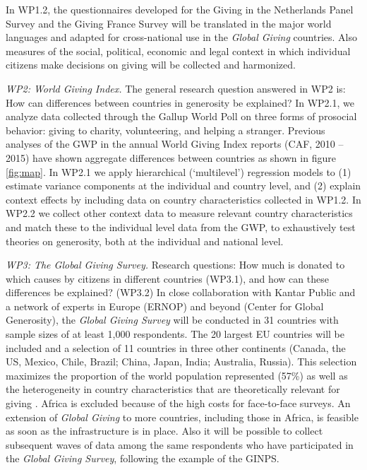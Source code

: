\documentclass[twocolumn, serif, rga, numeric]{jote-article}
\begin{document}
In WP1.2, the questionnaires developed for the Giving in the Netherlands Panel Survey and the Giving France Survey will be translated in the major world languages and adapted for cross-national use in the \emph{Global Giving} countries. Also measures of the social, political, economic and legal context \cite{Dehne2008, Quick2014} in which individual citizens make decisions on giving will be collected and harmonized.

\emph{WP2: World Giving Index.} The general research question answered in WP2 is: How can differences between countries in generosity be explained? In WP2.1, we analyze data collected through the Gallup World Poll on three forms of prosocial behavior: giving to charity, volunteering, and helping a stranger. Previous analyses of the GWP in the annual World Giving Index reports (CAF, 2010 -- 2015) have shown aggregate differences between countries as shown in figure \ref{fig:map}. In WP2.1 we apply hierarchical (`multilevel') regression models to (1) estimate variance components at the individual and country level, and (2) explain context effects by including data on country characteristics collected in WP1.2. In WP2.2 we collect other context data to measure relevant country characteristics and match these to the individual level data from the GWP, to exhaustively test theories on generosity, both at the individual and national level.

\emph{WP3: The Global Giving Survey.} Research questions: How much is donated to which causes by citizens in different countries (WP3.1), and how can these differences be explained? (WP3.2) In close collaboration with Kantar Public and a network of experts in Europe (ERNOP) and beyond (Center for Global Generosity), the \emph{Global Giving Survey} will be conducted in 31 countries with sample sizes of at least 1,000 respondents. The 20 largest EU countries will be included and a selection of 11 countries in three other continents (Canada, the US, Mexico, Chile, Brazil; China, Japan, India; Australia, Russia). This selection maximizes the proportion of the world population represented (57\%) as well as the heterogeneity in country characteristics that are theoretically relevant for giving \cite{Falk2018}. Africa is excluded because of the high costs for face-to-face surveys. An extension of \emph{Global Giving} to more countries, including those in Africa, is feasible as soon as the infrastructure is in place. Also it will be possible to collect subsequent waves of data among the same respondents who have participated in the \emph{Global Giving Survey}, following the example of the GINPS.
\end{document}
